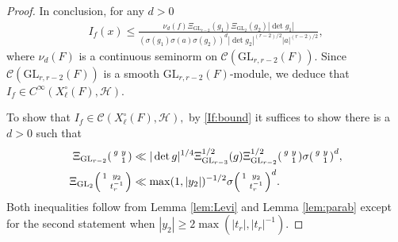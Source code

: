 \documentclass[12pt]{amsart}
\theoremstyle{remark}
\numberwithin{equation}{section}
\newcommand{\GL}{\mathrm{GL}}
\theoremstyle{definition}
\newenvironment{psmatrix}
  {\left(\begin{smallmatrix}}
  {\end{smallmatrix}\right)}
\numberwithin{equation}{subsection}
\begin{document}
\begin{proof}
In conclusion, for any $d>0$
\begin{align} \label{If:bound}
    I_{f}(x)\leq \frac{\nu_{d}(f) \Xi_{\GL_{r-2}}(g_1)\Xi_{\GL_2}(g_2)|\det g_1|}{(\sigma(g_1)\sigma(a)\sigma(g_2))^{d}|\det g_2|^{(r-2)/2}|a|^{(r-2)/2}},
\end{align}
where $\nu_{d}(F)$ is a continuous seminorm on $\mathcal{C}(\GL_{r,r-2}(F)).$
Since $\mathcal{C}(\GL_{r,r-2}(F))$ is a smooth $\GL_{r,r-2}(F)$-module, we deduce that $I_f \in C^\infty(X^\circ_{\ell}(F),\mathcal{H}).$


To show that $I_f\in \mathcal{C}(X_\ell^\circ(F),\mathcal{H}),$ by \eqref{If:bound} it suffices to show there is a $d>0$ such that
\begin{align*}
    \Xi_{\GL_{r-2}}\begin{psmatrix}
       g & y\\
        & 1
    \end{psmatrix}&\ll |\det g|^{1/4}\Xi_{\GL_{r-3}}^{1/2}(g)\Xi_{\GL_{r-2}}^{1/2}\begin{psmatrix}
       g & y\\
        & 1
    \end{psmatrix}\sigma\begin{psmatrix}
       g & y\\
        & 1
    \end{psmatrix}^d, \\
    \Xi_{\GL_2}\begin{psmatrix}
        1 & y_2\\
          & t_{r}^{-1}
    \end{psmatrix}&\ll \max(1,|y_2|)^{-1/2}\sigma\begin{psmatrix}
        1 & y_2\\
          & t_{r}^{-1}
    \end{psmatrix}^d.
\end{align*}
Both inequalities follow from Lemma \ref{lem:Levi} and Lemma \ref{lem:parab} except for the second statement when $|y_2|\ge 2\max(|t_r|,|t_r|^{-1}).$


\end{proof}
\end{document}
